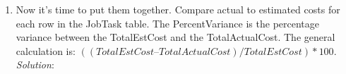 \documentclass{article}
\begin{document}
\begin{enumerate}
\begin{verbatim}
  \end{verbatim}


  \newpage
  \item Now it’s time to put them together. Compare actual to estimated costs for each row in the JobTask table. The PercentVariance is the percentage variance between the TotalEstCost and the TotalActualCost. The general calculation is: $((TotalEstCost – TotalActualCost)/TotalEstCost) * 100$.\\
  \textit{Solution}:
  \begin{verbatim}

  \end{verbatim}

  

\end{enumerate}
\end{document}
